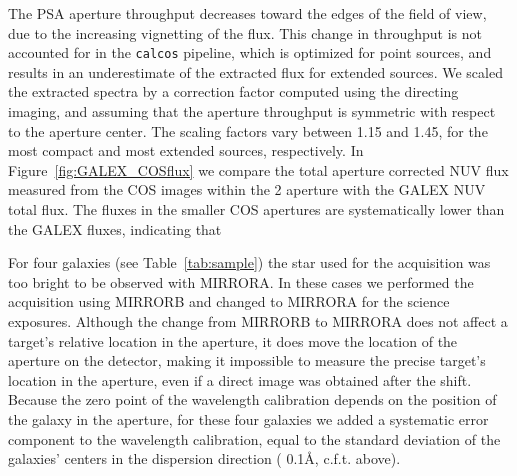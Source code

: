 \documentclass[manuscript]{emulateapj}
\begin{document}
The PSA aperture throughput decreases toward the edges of the field of
view, due to the increasing vignetting of the flux. This change in
throughput is not accounted for in the {\tt calcos} pipeline, which 
is optimized for point sources, and results in an underestimate of 
the extracted flux for extended
sources. We scaled the extracted spectra by a correction factor
computed using the directing imaging, and assuming that the aperture
throughput is symmetric with respect to the aperture center. The
scaling factors vary between 1.15 and 1.45, for the most compact and
most extended sources, respectively. In Figure~\ref{fig:GALEX_COSflux}
we compare the total aperture corrected NUV flux measured from the COS
images within the 2 aperture with the GALEX NUV total flux. The
fluxes in the smaller COS apertures are systematically lower than the
GALEX fluxes, indicating that 


For four galaxies (see Table~\ref{tab:sample}) the star used for the
acquisition was too bright to be observed with MIRRORA. In these cases
we performed the acquisition using MIRRORB and changed to MIRRORA for the
science exposures. Although the change from MIRRORB to MIRRORA does not
affect a target's relative location in the aperture, it does move the
location of the aperture on the detector, making it impossible to measure
the precise target's location in the aperture, even if a direct image
was obtained after the shift. Because the zero point of the wavelength
calibration depends on the position of the galaxy in the aperture, for
these four galaxies we added a systematic error component to the
wavelength calibration, equal to the standard deviation of the
galaxies' centers in the dispersion direction ( 0.1\AA, c.f.t. above).
\end{document}

